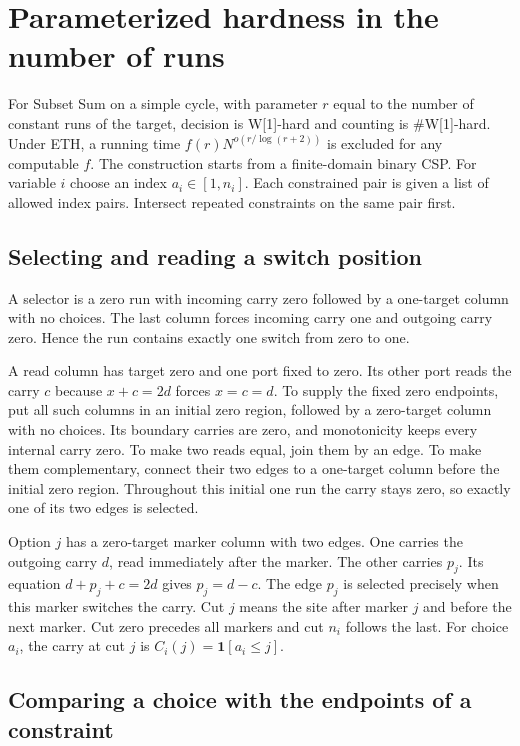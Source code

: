 \documentclass[11pt,a4paper]{article}
\numberwithin{equation}{section}
\begin{document}
\section{Parameterized hardness in the number of runs}\label{parameterized-hardness-in-the-number-of-runs}

For Subset Sum on a simple cycle, with parameter \(r\) equal to the number of constant runs of the target, decision is W{[}1{]}-hard and counting is \#W{[}1{]}-hard. Under ETH, a running time \(f(r)N^{o(r/\log(r+2))}\) is excluded for any computable \(f\). The construction starts from a finite-domain binary CSP. For variable \(i\) choose an index \(a_i\in[1,n_i]\). Each constrained pair is given a list of allowed index pairs. Intersect repeated constraints on the same pair first.

\subsection{Selecting and reading a switch position}\label{selecting-and-reading-a-switch-position}

A selector is a zero run with incoming carry zero followed by a one-target column with no choices. The last column forces incoming carry one and outgoing carry zero. Hence the run contains exactly one switch from zero to one.

A read column has target zero and one port fixed to zero. Its other port reads the carry \(c\) because \(x+c=2d\) forces \(x=c=d\). To supply the fixed zero endpoints, put all such columns in an initial zero region, followed by a zero-target column with no choices. Its boundary carries are zero, and monotonicity keeps every internal carry zero. To make two reads equal, join them by an edge. To make them complementary, connect their two edges to a one-target column before the initial zero region. Throughout this initial one run the carry stays zero, so exactly one of its two edges is selected.

Option \(j\) has a zero-target marker column with two edges. One carries the outgoing carry \(d\), read immediately after the marker. The other carries \(p_j\). Its equation \(d+p_j+c=2d\) gives \(p_j=d-c\). The edge \(p_j\) is selected precisely when this marker switches the carry. Cut \(j\) means the site after marker \(j\) and before the next marker. Cut zero precedes all markers and cut \(n_i\) follows the last. For choice \(a_i\), the carry at cut \(j\) is \(C_i(j)=\mathbf1[a_i\le j]\).

\subsection{Comparing a choice with the endpoints of a constraint}\label{comparing-a-choice-with-the-endpoints-of-a-constraint}
\end{document}
